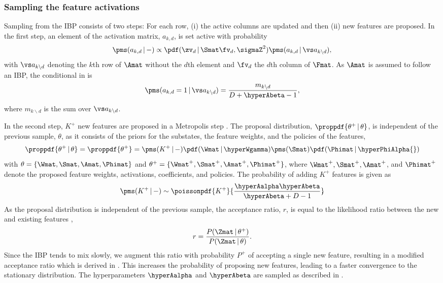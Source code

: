 \documentclass{article}
\begin{document}
\subsubsection{Sampling the feature activations}
Sampling from the \ac{IBP} consists of two steps: For each row, (i) the active columns are updated and then (ii) new features are proposed. 
In the first step, an element of the activation matrix, $a_{k,d}$, is set active with probability
\begin{align}
  \pms(a_{k,d}\,|\,-) \propto \pdf(\zv_d \,|\, \Smat \fv_d, \sigmaZ^2) \pms(a_{k,d}\,|\, \vs a_{k\backslash d} ),
  \label{eq::dm::inf::activations}
\end{align}
with $\vs a_{k\backslash d}$ denoting the $k$th row of $\Amat$ without the $d$th element and $\fv_d$ the $d$th column of $\Fmat$. 
As $\Amat$ is assumed to follow an \ac{IBP}, the conditional in  is \cite{Ghahramani2005, Ghahramani2007}
\begin{align*}
 \pms(a_{k,d} = 1\,|\, \vs a_{k\backslash d} ) = \frac{ m_{k\backslash d}}{D + \hyperAbeta - 1},
\end{align*}
where $m_{k\backslash d}$ is the sum over $\vs a_{k\backslash d}$.

In the second step, $K^+$ new features are proposed in a Metropolis step \cite{Doshi-Velez2009, Knowles2011}.
The proposal distribution, $\proppdf{\theta^+ \,|\, \theta}$, is independent of the previous sample, $\theta$, as it consists of the priors for the substates, the feature weights, and the policies of the features,
\begin{align}
  \proppdf{\theta^+ \,|\, \theta} = \proppdf{\theta^+ } =  \pms(K^+\,|\, -) \pdf(\Wmat\,|\,\hyperWgamma) \pms(\Smat) \pdf(\Phimat\,|\,\hyperPhiAlpha{})
\end{align}
with $\theta = \{ \Wmat, \Smat, \Amat, \Phimat \}$ and $\theta^+ = \{ \Wmat^+, \Smat^+, \Amat^+, \Phimat^+ \}$, where $\Wmat^+, \Smat^+, \Amat^+$, and $\Phimat^+$ denote the proposed feature weights, activations, coefficients, and policies. 
The probability of adding $K^+$ features is given as \cite{Ghahramani2005, Ghahramani2007}
\begin{align*}
 \pms(K^+\,|\, -) \sim \poissonpdf{K^+}{\frac{\hyperAalpha \hyperAbeta}{\hyperAbeta + D - 1}}\!\!.
\end{align*}
As the proposal distribution is independent of the previous sample, the acceptance ratio, $r$, is equal to the likelihood ratio between the new and existing features \cite{Meeds2006},
\begin{align*} 
 r = \frac{ P(\Zmat \,|\, \theta^+ )}{ P( \Zmat \,|\, \theta  )}.
\end{align*}
Since the \ac{IBP} tends to mix slowly, we augment this ratio with probability $P^+$ of accepting a single new feature, resulting in a modified acceptance ratio which is derived in \cite{Knowles2011}. This increases the probability of proposing new features, leading to a faster convergence to the stationary distribution. The hyperparameters $\hyperAalpha$ and $\hyperAbeta$ are sampled as described in \cite{Knowles2011}.
\end{document}
